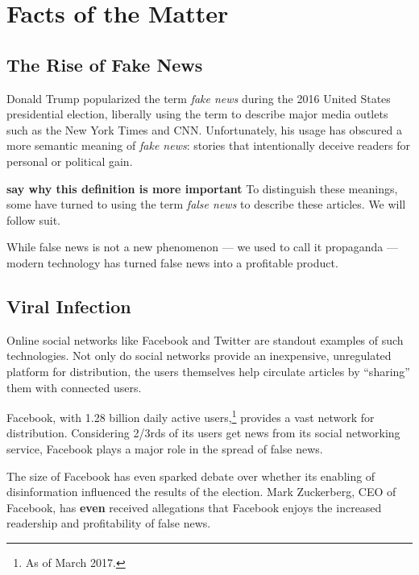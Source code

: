 

\section{Facts of the Matter}

\subsection{The Rise of Fake News}

\par Donald Trump popularized the term \emph{fake news} during the 2016 United States presidential election, liberally using the term to describe major media outlets such as the New York Times and CNN. \cite{telegraph_fn} Unfortunately, his usage has obscured a more semantic meaning of \emph{fake news}: stories that intentionally deceive readers for personal or political gain. \cite{npr_fn}

\par \textbf{say why this definition is more important} To distinguish these meanings, some have turned to using the term \emph{false news} to describe these articles. \cite{guardian_tips} We will follow suit.

\par While false news is not a new phenomenon --- we used to call it propaganda --- modern technology has turned false news into a profitable product. \cite{bbc_propaganda}

\subsection{Viral Infection}

\par Online social networks like Facebook and Twitter are standout examples of such technologies. Not only do social networks provide an inexpensive, unregulated platform for distribution, \cite{telegraph_fn} the users themselves help circulate articles by ``sharing'' them with connected users. \cite{telegraph_fn} 

\par Facebook, with 1.28 billion daily active users,\footnote{As of March 2017.} \cite{fb_newsroom} provides a vast network for distribution. Considering 2/3rds of its users get news from its social networking service, \cite{pew_news} Facebook plays a major role in the spread of false news.

\par The size of Facebook has even sparked debate over whether its enabling of disinformation influenced the results of the election. \cite{wp_russia,guardian_steps,tc_snowden} Mark Zuckerberg, CEO of Facebook, has \textbf{even} received allegations that Facebook enjoys the increased readership and profitability of false news. \cite{tc_responsibility}

